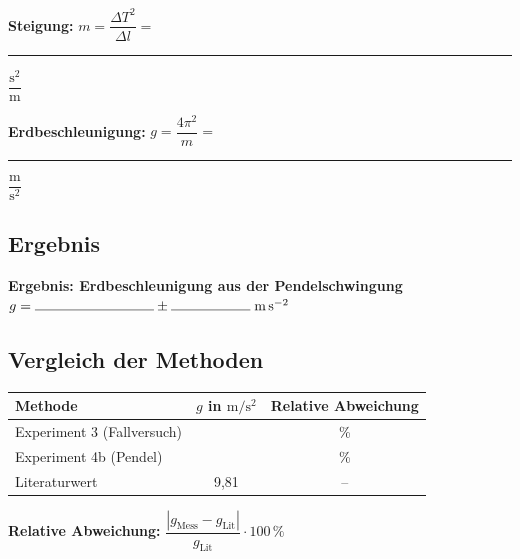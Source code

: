 \documentclass[11pt,a4paper]{scrartcl}
\begin{document}
	\vspace{0.3cm}
	
	\textbf{Steigung:} $m = \dfrac{\Delta T^2}{\Delta l} = $ \rule{4cm}{0.4pt} $\dfrac{\text{s}^2}{\text{m}}$
	
	\vspace{0.5cm}
	
	\textbf{Erdbeschleunigung:} $g = \dfrac{4\pi^2}{m} = $ \rule{4cm}{0.4pt} $\dfrac{\text{m}}{\text{s}^2}$
	
	\newpage
	
	\subsection*{Ergebnis}
	
	\begin{tcolorbox}[colback=yellow!10!white, colframe=yellow!50!black, width=\textwidth]
		\centering
		\textbf{Ergebnis: Erdbeschleunigung aus der Pendelschwingung}\\[0.3cm]
		{\Large $g = \rule{3cm}{0.4pt} \pm \rule{2cm}{0.4pt}\;\si{\metre\per\second\squared}$}
	\end{tcolorbox}
	
	\vspace{0.5cm}
	
	\subsection*{Vergleich der Methoden}
	
	\begin{center}
		\renewcommand{\arraystretch}{2.0}
		\begin{tabular}{|l|c|c|}
			\hline
			\textbf{Methode} & $g$ in $\si{\metre\per\second\squared}$ & \textbf{Relative Abweichung} \\
			\hline
			Experiment 3 (Fallversuch) & & \% \\
			\hline
			Experiment 4b (Pendel) & & \% \\
			\hline
			Literaturwert & 9,81 & -- \\
			\hline
		\end{tabular}
	\end{center}
	
	\vspace{0.3cm}
	
	\textbf{Relative Abweichung:} $\dfrac{|g_{\text{Mess}} - g_{\text{Lit}}|}{g_{\text{Lit}}} \cdot 100\,\%$
	
\end{document}
